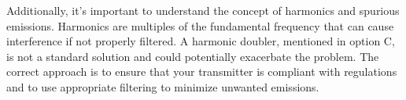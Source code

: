 Additionally, it’s important to understand the concept of harmonics and spurious emissions. Harmonics are multiples of the fundamental frequency that can cause interference if not properly filtered. A harmonic doubler, mentioned in option C, is not a standard solution and could potentially exacerbate the problem. The correct approach is to ensure that your transmitter is compliant with regulations and to use appropriate filtering to minimize unwanted emissions.

